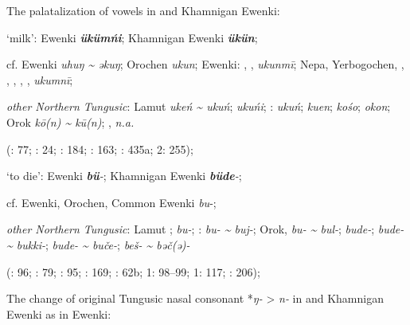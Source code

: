 \documentclass[output=paper,colorlinks,citecolor=brown]{langscibook}
\begin{document}
\z
\z

\ea
The palatalization of vowels in  and Khamnigan Ewenki:

\ea  ‘milk’:  Ewenki \textbf{\textit{ükümńi}}; Khamnigan Ewenki \textbf{\textit{ükün}};

    cf.  Ewenki \textit{uhuŋ {\textasciitilde} əkuŋ}; Orochen \textit{ukun};  Ewenki: , ,  \textit{ukunmī}; Nepa, Yerbogochen, , , , , ,  \textit{ukumnī};

    \textit{other Northern Tungusic}: Lamut \textit{ukeń {\textasciitilde} ukuń};  \textit{ukuńi}; \textit{}:  \textit{ukuń};  \textit{kuen};  \textit{kośo};  \textit{okon}; Orok \textit{kō(n) {\textasciitilde} kū(n)}; ,  \textit{n.a.}
    
    (\citealt{Castrén1856}: 77; \citealt{Janhunen1991}: 24; \citealt{Chaoke2014bB}: 184; \citealt{Chaoke2014a}: 163; \citealt{Vasilevic1958}: 435a; \citealt{Cincius1975B} 2: 255);

    \item ‘to die’:  Ewenki \textbf{\textit{bü}}\textit{{}-}; Khamnigan Ewenki \textbf{\textit{büde}}\textit{{}-};

    cf.  Ewenki, Orochen,  Common Ewenki \textit{bu}{}-;

    \textit{other Northern Tungusic}: Lamut ;  \textit{bu-}; \textit{}:  \textit{bu{}- {\textasciitilde} buj-}; Orok,  \textit{bu- {\textasciitilde} bul-};  \textit{bude-};  \textit{bude- {\textasciitilde} bukki-};  \textit{bude- {\textasciitilde} buče-};  \textit{beš- {\textasciitilde} bǝč(ǝ)-}
    
    (\citealt{Castrén1856}: 96; \citealt{Janhunen1991}: 79; \citealt{Dorji1998}: 95; \citealt{Chaoke2014a}: 169; \citealt{Vasilevic1958}: 62b; \citealt{Cincius1975B} 1: 98--99; \citealt{Hauer1952} 1: 117; \citealt{Zikmundová2013a}: 206);

\z
\z

\ea
The change of original Tungusic nasal consonant *\textit{ŋ-} > \textit{n-} in  and Khamnigan Ewenki as in  Ewenki:
\end{document}
